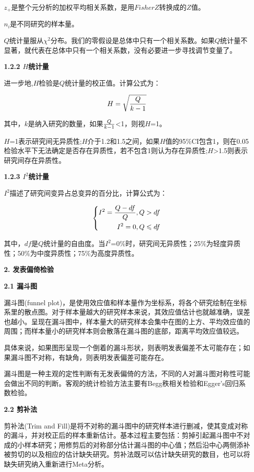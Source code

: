 \documentclass[
]{book}
\begin{document}
\(z_{+}\)是整个元分析的加权平均相关系数，是用\(FisherZ\)转换成的\(Z\)值。

\(n_{i}\)是不同研究的样本量。

\(Q\)统计量服从\(\chi^{2}\)分布。我们的零假设是总体中只有一个相关系数。如果\(Q\)统计量不显著，就代表在总体中只有一个相关系数，没有必要进一步寻找调节变量了。

\textbf{1.2.2 \(H\)统计量}

进一步地,\(H\)检验是\(Q\)统计量的校正值。计算公式为：

\[
H=\sqrt{{Q}\over{k-1}}
\]

其中，\(k\)是纳入研究的数量，如果\({Q}\over{k-1}\)\textless1，则视\(H\)=1。

\(H\)=1表示研究间无异质性;\(H\)介于1.2和1.5之间，如果\(H\)值的95\%CI包含1，则在0.05检验水平下无法确定是否存在异质性，若不包含1则认为存在异质性;\(H\)\textgreater1.5则表示研究间存在异质性。

\textbf{1.2.3 \(I^{2}\)统计量}

\(I^{2}\)描述了研究间变异占总变异的百分比，计算公式为：

\[
\left\{ \begin{aligned} 
        I^{2} = {{{Q-df}\over{Q}},Q>df} \\
        I^{2} = 0,{Q}\leqslant{df}
\end{aligned} \right.
\]

其中，\(df\)是\(Q\)统计量的自由度。当\(I^{2}\)=0\%时，研究间无异质性；25\%为轻度异质性；50\%为中度异质性；75\%为高度异质性。

\textbf{2. 发表偏倚检验}

\textbf{2.1 漏斗图}

漏斗图(funnel plot)，是使用效应值和样本量作为坐标系，将各个研究绘制在坐标系里的散点图。对于样本量越大的研究样本来说，其效应值估计也就越准确，误差也越小。呈现在漏斗图中，样本量大的研究样本会集中在图的上方、平均效应值的周围；而样本量小的研究样本则会散落在漏斗图的底部，距离平均效应值较远。

具体来说，如果图形呈现一个倒着的漏斗形状，则表明发表偏差不太可能存在；如果漏斗图不对称，有缺角，则表明发表偏差可能存在。

漏斗图是一种主观的定性判断有无发表偏倚的方法，不同的人对漏斗图对称性可能会做出不同的判断。客观的统计检验方法主要有Begg秩相关检验和Egger's回归系数检验。

\textbf{2.2 剪补法}

剪补法(Trim and Fill)是将不对称的漏斗图中的研究样本进行删减，使其变成对称的漏斗，并对校正后的样本重新估计。基本过程主要包括：剪掉引起漏斗图中不对成的小样本研究；用修剪后的对称部分估计漏斗图的中心值；然后沿中心两侧添补被剪切的以及相应的估计缺失研究。剪补法既可以估计缺失研究的数目，也可以将缺失研究纳入重新进行Meta分析。
\end{document}
